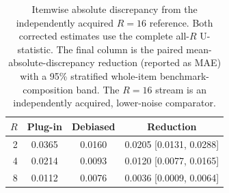 \begin{table}[!t]
\centering
\setlength{\tabcolsep}{3.2pt}
\begin{tabular}{rccc}
\toprule
$R$ & Plug-in & Debiased & Reduction \\
\midrule
2 & 0.0365 & 0.0160 & 0.0205 [0.0131, 0.0288] \\
4 & 0.0214 & 0.0093 & 0.0120 [0.0077, 0.0165] \\
8 & 0.0112 & 0.0076 & 0.0036 [0.0009, 0.0064] \\
\bottomrule
\end{tabular}
\caption{Itemwise absolute discrepancy from the independently acquired
$R=16$ reference. Both corrected estimates use the complete all-$R$
U-statistic. The final column is the paired mean-absolute-discrepancy reduction
(reported as MAE) with a 95\% stratified whole-item benchmark-composition
band. The $R=16$ stream is an independently acquired, lower-noise
comparator.\maintextreproductionnote}
\end{table}
